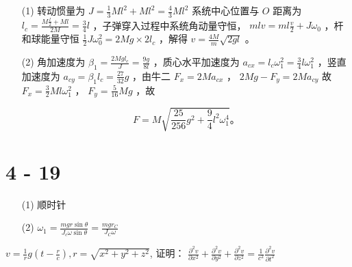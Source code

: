 \documentclass{article}
\begin{document}
\begin{itemize}
    \item [(1)] 转动惯量为  $ J = \frac{1}{3}Ml^2 + Ml^2 = \frac{4}{3}Ml^2 $ 系统中心位置与  $ O $  距离为  $ l_c = \frac{M\frac{l}{2} + Ml}{2M} = \frac{3}{4}l $ ，子弹穿入过程中系统角动量守恒， $ mlv = ml\frac{v}{2} + J\omega_0 $ ，杆和球能量守恒  $ \frac{1}{2}J\omega_0^2 = 2Mg \times 2l_c $ ，解得  $ v = \frac{4M}{m}\sqrt{2gl} $ 。

    \item [(2)] 角加速度为  $ \beta_1 = \frac{2Mgl_c}{J} = \frac{9g}{8l} $ ，质心水平加速度为  $ a_{cx} = l_c\omega_1^2 = \frac{3}{4}l\omega_1^2 $ ，竖直加速度为  $ a_{cy} = \beta_1 l_c = \frac{27}{32}g $ ，由牛二  $ F_x = 2Ma_{cx} $ ， $ 2Mg - F_y = 2Ma_{cy} $ 故  $ F_x = \frac{3}{2}Ml\omega_1^2 $ ， $ F_y = \frac{5}{16}Mg $ ，故
    
 $$
    F = M\sqrt{\frac{25}{256}g^2 + \frac{9}{4}l^2\omega_1^4}。
    $$ 
\end{itemize}

\section*{4 - 19}

\begin{itemize}
    \item [(1)] 顺时针
    \item [(2)] $\omega_1 = \frac{mgr\sin \theta}{J_c\omega\sin \theta} = \frac{mgr_C}{J_C\omega}$
\end{itemize}

$v = \frac{1}{r}g\left(t - \frac{r}{c}\right), r = \sqrt{x^2 + y^2 + z^2}$, 证明： $\frac{\partial^2 v}{\partial x^2} + \frac{\partial^2 v}{\partial y^2} + \frac{\partial^2 v}{\partial z^2} = \frac{1}{c^2}\frac{\partial^2 v}{\partial t^2}$
\end{document}
